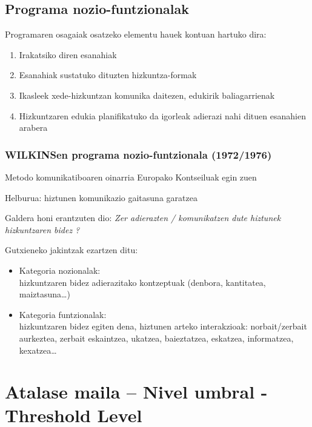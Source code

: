 \documentclass[
]{book}
\providecommand{\tightlist}{%
  \setlength{\itemsep}{0pt}\setlength{\parskip}{0pt}}
\begin{document}
\hypertarget{programa-nozio-funtzionalak}{%
\section{Programa nozio-funtzionalak}\label{programa-nozio-funtzionalak}}

Programaren osagaiak osatzeko elementu hauek kontuan hartuko dira:

\begin{enumerate}
\def\labelenumi{\arabic{enumi}.}
\tightlist
\item
  Irakatsiko diren esanahiak
\item
  Esanahiak sustatuko dituzten hizkuntza-formak
\item
  Ikasleek xede-hizkuntzan komunika daitezen, edukirik baliagarrienak
\item
  Hizkuntzaren edukia planifikatuko da igorleak adierazi nahi dituen esanahien arabera
\end{enumerate}

\hypertarget{wilkinsen-programa-nozio-funtzionala-19721976}{%
\subsection{WILKINSen programa nozio-funtzionala (1972/1976)}\label{wilkinsen-programa-nozio-funtzionala-19721976}}

Metodo komunikatiboaren oinarria Europako Kontseiluak egin zuen

Helburua: hiztunen komunikazio gaitasuna garatzea

Galdera honi erantzuten dio: \emph{Zer adierazten / komunikatzen dute hiztunek hizkuntzaren bidez ?}

Gutxieneko jakintzak ezartzen ditu:

\begin{itemize}
\tightlist
\item
  Kategoria nozionalak:\\
  hizkuntzaren bidez adierazitako kontzeptuak (denbora, kantitatea, maiztasuna\ldots)
\item
  Kategoria funtzionalak:\\
  hizkuntzaren bidez egiten dena, hiztunen arteko interakzioak: norbait/zerbait aurkeztea, zerbait eskaintzea, ukatzea, baieztatzea, eskatzea, informatzea, kexatzea\ldots{}
\end{itemize}

\hypertarget{atalase-maila-nivel-umbral---threshold-level}{%
\chapter{Atalase maila -- Nivel umbral - Threshold Level}\label{atalase-maila-nivel-umbral---threshold-level}}
\end{document}

